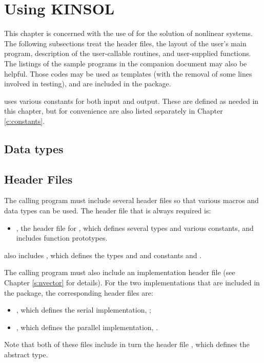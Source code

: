 \chapter{Using KINSOL}\label{c:usage}

This chapter is concerned with the use of {\kinsol} for the solution
of nonlinear systems.  The following subsections treat the header
files, the layout of the user's main program, description of the
{\kinsol} user-callable routines, and user-supplied functions.  The
listings of the sample programs in the companion document
\cite{kinsol2.2.0_ex} may also be helpful.  Those codes may be used as
templates (with the removal of some lines involved in testing), and
are included in the {\kinsol} package.

{\kinsol} uses various constants for both input and output.  These are
defined as needed in this chapter, but for convenience are also listed
separately in Chapter \ref{c:constants}.

\section{Data types}\label{s:types}


\section{Header Files}\label{s:header_sol}

The calling program must include several header files so that various macros
and data types can be used. The header file that is always required is:
%
\begin{itemize}
\item  {}, 
  the header file for {\kinsol}, which defines several
  types and various constants, and includes function prototypes.
\end{itemize}
%
 also includes , 
which defines the types  and 
and constants  and .

The calling program must also include an {\nvector} implementation header file
(see Chapter \ref{s:nvector} for details).
For the two {\nvector} implementations that are included in the {\kinsol} package,
the corresponding header files are:
%
\begin{itemize}
\item {}, 
  which defines the serial implementation, {\nvecs};
\item {}, 
  which defines the parallel {\mpi} implementation, {\nvecp}.
\end{itemize}
%
Note that both of these files include in turn the header file , which 
defines the abstract  type. 

